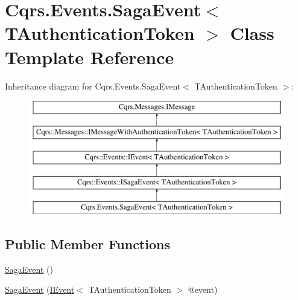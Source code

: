 \hypertarget{classCqrs_1_1Events_1_1SagaEvent}{}\section{Cqrs.\+Events.\+Saga\+Event$<$ T\+Authentication\+Token $>$ Class Template Reference}
\label{classCqrs_1_1Events_1_1SagaEvent}
Inheritance diagram for Cqrs.\+Events.\+Saga\+Event$<$ T\+Authentication\+Token $>$\+:\begin{figure}[H]
\begin{center}
\leavevmode
\includegraphics[height=5.000000cm]{classCqrs_1_1Events_1_1SagaEvent}
\end{center}
\end{figure}
\subsection*{Public Member Functions}
\begin{DoxyCompactItemize}
\item 
\hyperlink{classCqrs_1_1Events_1_1SagaEvent_a658ce04baccb816bf132702cccaa6a90}{Saga\+Event} ()
\item 
\hyperlink{classCqrs_1_1Events_1_1SagaEvent_aeb42f8e8f8e18bffe0dbe55b3da3c476}{Saga\+Event} (\hyperlink{interfaceCqrs_1_1Events_1_1IEvent}{I\+Event}$<$ T\+Authentication\+Token $>$ @event)
\end{DoxyCompactItemize}
